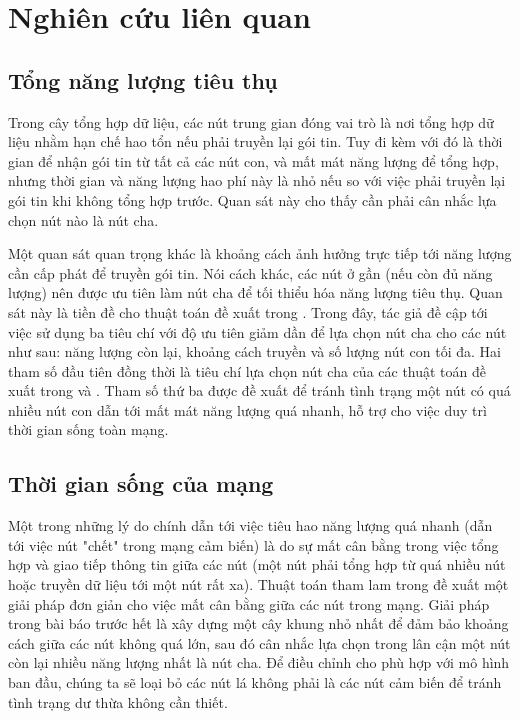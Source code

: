 \section{Nghiên cứu liên quan}
\subsection{Tổng năng lượng tiêu thụ}
Trong cây tổng hợp dữ liệu, các nút trung gian đóng vai trò là nơi tổng hợp dữ liệu nhằm hạn chế hao tổn nếu phải truyền lại gói tin. Tuy đi kèm với đó là thời gian để nhận gói tin từ tất cả các nút con, và mất mát năng lượng để tổng hợp, nhưng thời gian và năng lượng hao phí này là nhỏ nếu so với việc phải truyền lại gói tin khi không tổng hợp trước. Quan sát này cho thấy cần phải cân nhắc lựa chọn nút nào là nút cha.


Một quan sát quan trọng khác là khoảng cách ảnh hưởng trực tiếp tới năng lượng cần cấp phát để truyền gói tin. Nói cách khác, các nút ở gần (nếu còn đủ năng lượng) nên được ưu tiên làm nút cha để tối thiểu hóa năng lượng tiêu thụ. Quan sát này là tiền đề cho thuật toán đề xuất trong \cite{eskandari2008energy}. Trong đây, tác giả đề cập tới việc sử dụng ba tiêu chí với độ ưu tiên giảm dần để lựa chọn nút cha cho các nút như sau: năng lượng còn lại, khoảng cách truyền và số lượng nút con tối đa. Hai tham số đầu tiên đồng thời là tiêu chí lựa chọn nút cha của các thuật toán đề xuất trong \cite{lee2005energy} và \cite{lee2005lpt}. Tham số thứ ba được đề xuất để tránh tình trạng một nút có quá nhiều nút con dẫn tới mất mát năng lượng quá nhanh, hỗ trợ cho việc duy trì thời gian sống toàn mạng.

\subsection{Thời gian sống của mạng}
Một trong những lý do chính dẫn tới việc tiêu hao năng lượng quá nhanh (dẫn tới việc nút "chết" trong mạng cảm biến) là do sự mất cân bằng trong việc tổng hợp và giao tiếp thông tin giữa các nút (một nút phải tổng hợp từ quá nhiều nút hoặc truyền dữ liệu tới một nút rất xa). Thuật toán tham lam trong \cite{liu2019heuristic} đề xuất một giải pháp đơn giản cho việc mất cân bằng giữa các nút trong mạng. Giải pháp trong bài báo trước hết là xây dựng một cây khung nhỏ nhất để đảm bảo khoảng cách giữa các nút không quá lớn, sau đó cân nhắc lựa chọn trong lân cận một nút còn lại nhiều năng lượng nhất là nút cha. Để điều chỉnh cho phù hợp với mô hình ban đầu, chúng ta sẽ loại bỏ các nút lá không phải là các nút cảm biến để tránh tình trạng dư thừa không cần thiết.


